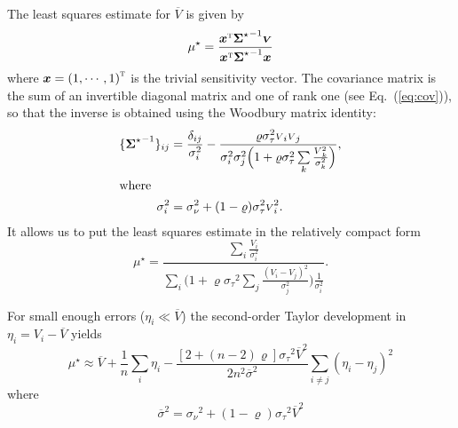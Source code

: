 \documentclass[twocolumn]{article}
\def\eqref#1{Eq.~(\ref{eq:#1})}
\def\vec#1{\ensuremath{\boldsymbol{#1}}}
\def\tr#1{\ensuremath{{#1}^\text{\textsc{t}}}}
\def\ppp#1{#1^\star}
\def\norm{_\tau}
\def\meas{_\nu}
\def\mean#1{\overline{#1}}
\def\data{\ensuremath{{\scriptstyle V}}}
\def\vdata{\ensuremath{\vec\data}}
\def\datamean{\ensuremath{\mean\data}}
\def\mod{\ensuremath{\mu}}
\def\error{\ensuremath{\eta}}
\def\dev{\ensuremath{\sigma}}
\def\devmean{\ensuremath{\mean\dev}}
\def\reldev{\ensuremath{\dev\norm}}
\def\absdev{\ensuremath{\dev\meas}}
\def\cov{\ensuremath{\Sigma}}
\def\vcov{\ensuremath{\vec\cov}}
\def\corr{\ensuremath{\varrho}}
\def\sens{\ensuremath{x}}
\def\vsens{\ensuremath{\vec\sens}}
\begin{document}
The least squares estimate for $\datamean$ is given by
\begin{equation}
    \ppp{\mod} =
                  \frac { \tr\vsens{\ppp\vcov}^{-1}\vdata }
                        { \tr\vsens{\ppp\vcov}^{-1}\vsens }
\end{equation}
where $\vsens = \tr{(1, \cdots, 1)}$ is the trivial sensitivity vector.  The covariance matrix is the sum of an invertible diagonal matrix and one of rank one (see \eqref{cov}), so that the inverse is obtained using the Woodbury matrix identity: 
\begin{align}
    \{ {\ppp\vcov}^{-1} \}_{ij} &= \frac{\delta_{ij}}{\dev_i^2}
         - \frac{\corr\reldev^2\data_i\data_j}
                {\dev_i^2\dev_j^2\Big(1 + 
            \corr\reldev^2\sum\limits_{k} \frac{\data_k^2}{\dev_k^2}\Big)},\\
  \intertext{where}
  \dev_i^2 &= \absdev^2+(1-\corr)\reldev^2\data_i^2.
\end{align}
It allows us to put the least squares estimate in the relatively compact form 
\begin{equation}
  \ppp{\mod} = 
    \frac { 
      \sum\limits_i \frac{\data_i}{\dev_i^2}
    }{ 
      \sum\limits_i 
          \Big( 1   
             + \corr\reldev^2\sum\limits_{j} \frac{(\data_i-\data_j)^2}{\dev_j^2}
           \Big)
          \frac{1}{\dev_i^2} 
   }.\label{eq:mu}
\end{equation}


For small enough errors ($\error_i \ll \datamean$) the second-order Taylor development in $\error_i = \data_i - \datamean$ yields 
\begin{equation}
    \ppp{\mod} \approx  \datamean 
                  +\frac1n {\sum\limits_i \error_i}
                       - \frac {[2 + (n - 2)\corr]\reldev^2\datamean^2
                          }{
                           2n^2 \devmean^2             
                          }
                           \sum\limits_{i\ne j} (\error_i-\error_j)^2
\end{equation}
where
\begin{equation}
    \devmean^2 = \absdev^2+(1-\corr)\reldev^2\datamean^2 
\end{equation}
\end{document}
